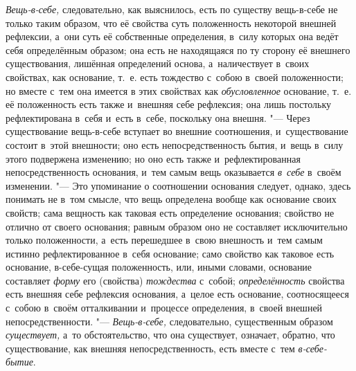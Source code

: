 {\em Вещь-в-себе,} следовательно, как выяснилось, есть
по существу вещь-в-себе не только таким образом, что её свойства суть
положенность некоторой внешней рефлексии, а~они суть её собственные
определения, в~силу которых она ведёт себя определённым образом; она есть
не находящаяся по ту сторону её внешнего существования, лишённая
определений основа, а~наличествует в~своих свойствах, как основание, т.~е.
есть тождество с~собою в~своей положенности; но вместе с~тем она имеется в
этих свойствах как {\em обусловленное} основание, т.~е.
её положенность есть также и~внешняя себе рефлексия; она лишь постольку
рефлектирована в~себя и~есть в~себе, поскольку она внешня. "--- Через
существование вещь-в-себе вступает во внешние соотношения, и~существование
состоит в~этой внешности; оно есть непосредственность бытия, и~вещь в~силу
этого подвержена изменению; но оно есть также и~рефлектированная
непосредственность основания, и~тем самым вещь оказывается
{\em в~себе} в~своём изменении. "--- Это упоминание о
соотношении основания следует, однако, здесь понимать не в~том смысле, что
вещь определена вообще как основание своих свойств; сама вещность как
таковая есть определение основания; свойство не отлично от своего
основания; равным образом оно не составляет исключительно только
положенности, а~есть перешедшее в~свою внешность и~тем самым истинно
рефлектированное в~себя основание; само свойство как таковое есть
основание, в-себе-сущая положенность, или, иными словами, основание
составляет {\em форму} его (свойства) {\em тождества} с~собой;
{\em определённость} свойства есть внешняя себе
рефлексия основания, а~целое есть основание, соотносящееся с~собою в~своём
отталкивании и~процессе определения, в~своей внешней непосредственности. "---
{\em Вещь-в-себе,} следовательно, существенным образом
{\em существует,} а~то обстоятельство, что она
существует, означает, обратно, что существование, как внешняя
непосредственность, есть вместе с~тем {\em в-себе-бытие}.


